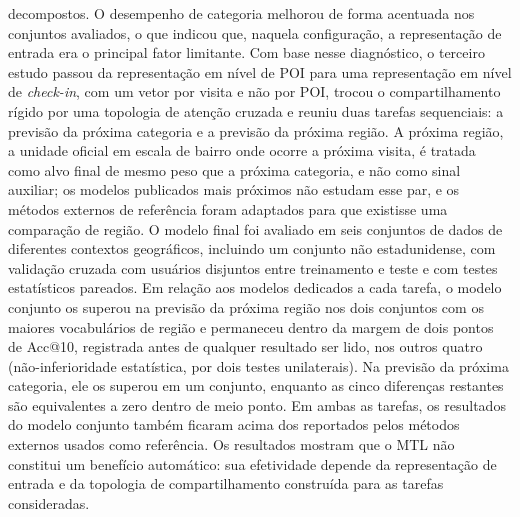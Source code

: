 \begin{resumo}[Resumo]
        decompostos. O desempenho de categoria melhorou de forma acentuada nos
        conjuntos avaliados, o que indicou que, naquela configuração, a representação
        de entrada era o principal fator limitante. Com base nesse diagnóstico, o
        terceiro estudo passou da representação em nível de POI para uma representação
        em nível de \emph{check-in}, com um vetor por visita e não por POI, trocou o
        compartilhamento rígido por uma topologia de atenção cruzada e reuniu duas
        tarefas sequenciais: a previsão da próxima categoria e a previsão da próxima
        região. A próxima região, a unidade oficial em escala de bairro onde ocorre a
        próxima visita, é tratada como alvo final de mesmo peso que a próxima
        categoria, e não como sinal auxiliar; os modelos publicados mais próximos não
        estudam esse par, e os métodos externos de referência foram adaptados para que
        existisse uma comparação de região. O modelo final foi avaliado em seis
        conjuntos de dados de diferentes contextos geográficos, incluindo um conjunto
        não estadunidense, com validação cruzada com usuários disjuntos entre
        treinamento e teste e com testes estatísticos pareados.
        Em relação aos modelos dedicados a cada tarefa, o modelo conjunto os superou na
        previsão da próxima região nos dois conjuntos com os maiores vocabulários de
        região e permaneceu dentro da margem de dois pontos de Acc@10, registrada antes
        de qualquer resultado ser lido, nos outros quatro (não-inferioridade
        estatística, por dois testes unilaterais). Na previsão da próxima categoria,
        ele os superou em um conjunto, enquanto as cinco diferenças restantes são
        equivalentes a zero dentro de meio ponto. Em ambas as tarefas, os resultados do modelo conjunto também
        ficaram acima dos reportados pelos métodos externos usados como referência.
        Os resultados mostram que o MTL não constitui um benefício automático: sua efetividade depende da representação de entrada e da topologia de compartilhamento construída para as tarefas consideradas.


\end{resumo}
